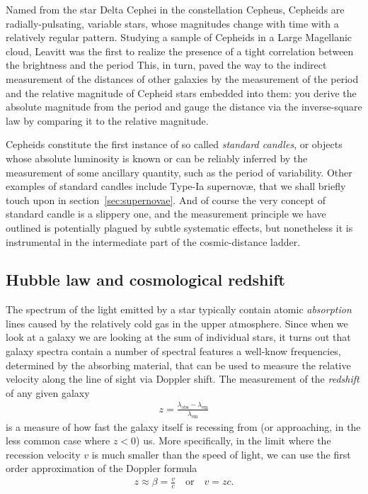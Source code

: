 Named from the star Delta Cephei in the constellation Cepheus, Cepheids are
radially-pulsating, variable stars, whose magnitudes change with time with a relatively
regular pattern. Studying a sample of Cepheids in a Large Magellanic cloud, Leavitt
was the first to realize the presence of a tight correlation between the brightness
and the period This, in
turn, paved the way to the indirect measurement of the distances of other galaxies
by the measurement of the period and the relative magnitude of Cepheid stars embedded
into them: you derive the absolute magnitude from the period and gauge the distance
via the inverse-square law by comparing it to the relative magnitude.

Cepheids constitute the first instance of so called \emph{standard candles}, or
objects whose absolute luminosity is known or can be reliably inferred by the
measurement of some ancillary quantity, such as the period of variability. Other
examples of standard candles include Type-Ia supernov\ae, that we shall briefly
touch upon in section~\ref{sec:supernovae}. And of course the very concept of standard
candle is a slippery one, and the measurement principle we have outlined is potentially
plagued by subtle systematic effects, but nonetheless it is instrumental in the
intermediate part of the cosmic-distance ladder.



\subsection{Hubble law and cosmological redshift}
\label{sec:hubble_law}

The spectrum of the light emitted by a star typically contain atomic \emph{absorption}
lines caused by the relatively cold gas in the upper atmosphere. Since when we look
at a galaxy we are looking at the sum of individual stars, it turns
out that galaxy spectra contain a number of spectral features a well-know frequencies,
determined by the absorbing material, that can be used to measure the relative velocity
along the line of sight via Doppler shift. The measurement of the \emph{redshift}
of any given galaxy
\begin{align}
	z = \frac{\lambda_\text{obs} - \lambda_\text{em}}{\lambda_\text{em}}
\end{align}
is a measure of how fast the galaxy itself is recessing from (or approaching, in
the less common case where $z < 0$) us. More specifically, in the limit where the
recession velocity $v$ is much smaller than the speed of light, we can use the
first order approximation of the Doppler formula
\begin{align*}
	z \approx \beta = \frac{v}{c} \quad\text{or}\quad v = zc.
\end{align*}

